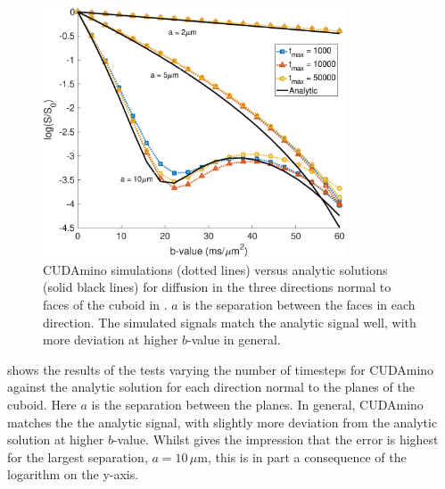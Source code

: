 \begin{figure}
  \centering
  \includegraphics[width=0.8\textwidth]{figures/cudamino/new/cuboid_all_cudamino_tmax.eps}
  \caption{CUDAmino simulations (dotted lines) versus analytic solutions (solid black lines) for diffusion in the three directions normal to faces of the cuboid in . $a$ is the separation between the faces in each direction. The simulated signals match the analytic signal well, with more deviation at higher $b$-value in general. }
  \label{fig:cuboid_cudamino_tmax}
\end{figure}


 shows the results of the tests varying the number of timesteps for CUDAmino against the analytic solution for each direction normal to the planes of the cuboid. Here $a$ is the separation between the planes. In general, CUDAmino matches the the analytic signal, with slightly more deviation from the analytic solution at higher $b$-value.
Whilst  gives the impression that the error is highest for the largest separation, $a=10\,\mu$m, this is in part a consequence of the logarithm on the y-axis.

